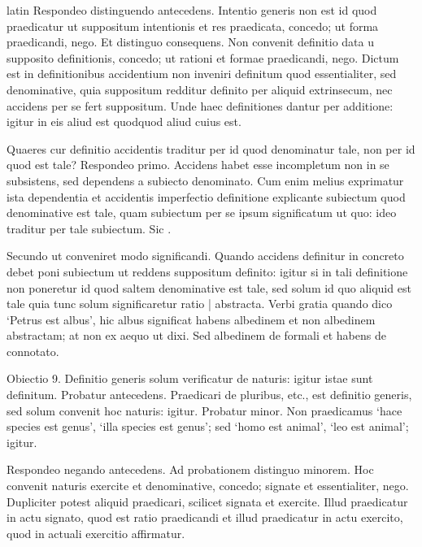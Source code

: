 \begin{otherlanguage*}{latin}
\pstart
  Respondeo distinguendo antecedens. Intentio generis non est id quod praedicatur ut suppositum intentionis et res praedicata, concedo; ut forma praedicandi, nego. Et distinguo consequens. Non convenit definitio data u supposito definitionis, concedo; ut rationi et formae praedicandi, nego. Dictum est in definitionibus accidentium non inveniri definitum quod essentialiter, sed denominative, quia suppositum redditur definito per aliquid extrinsecum, nec accidens per se fert suppositum. Unde haec definitiones dantur per additione: igitur in eis aliud est quodquod aliud cuius est. 
\pend

\pstart
  Quaeres cur definitio accidentis traditur per id quod denominatur tale, non per id quod est tale? Respondeo primo. Accidens habet esse incompletum non in se subsistens, sed dependens a subiecto denominato. Cum enim melius exprimatur ista dependentia et accidentis imperfectio definitione explicante subiectum quod denominative est tale, quam subiectum per se ipsum significatum ut quo: ideo traditur per tale subiectum. Sic . 
\pend

\pstart
  Secundo ut conveniret modo significandi. Quando accidens definitur in concreto debet poni subiectum ut reddens suppositum definito: igitur si in tali definitione non poneretur id quod saltem denominative est tale, sed solum id quo aliquid est tale quia tunc solum significaretur ratio \textnormal{|} abstracta. Verbi gratia quando dico `Petrus est albus', hic albus significat habens albedinem et non albedinem abstractam; at non ex aequo ut dixi. Sed albedinem de formali et habens de connotato. 
\pend

\pstart
  Obiectio 9. Definitio generis solum verificatur de naturis: igitur istae sunt definitum. Probatur antecedens. Praedicari de pluribus, etc., est definitio generis, sed solum convenit hoc naturis: igitur. Probatur minor. Non praedicamus `hace species est genus', `illa species est genus'; sed `homo est animal', `leo est animal'; igitur. 
\pend

\pstart
  Respondeo negando antecedens. Ad probationem distinguo minorem. Hoc convenit naturis exercite et denominative, concedo; signate et essentialiter, nego. Dupliciter potest aliquid praedicari, scilicet signata et exercite. Illud praedicatur in actu signato, quod est ratio praedicandi et illud praedicatur in actu exercito, quod in actuali exercitio affirmatur. 
\pend


\end{otherlanguage*}
